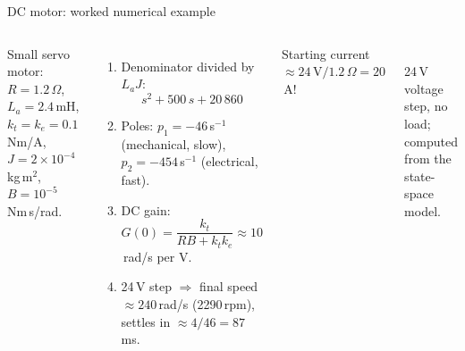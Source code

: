 \documentclass[aspectratio=169,10pt]{beamer}
\begin{document}
\begin{frame}{DC motor: worked numerical example}
\begin{columns}[T]
\footnotesize
Small servo motor: $R=1.2\,\Omega$, $L_a=2.4$\,mH, $k_t=k_e=0.1$\,Nm/A, $J=2\times10^{-4}$\,kg\,m$^2$, $B=10^{-5}$\,Nm\,s/rad.
\begin{enumerate}
  \item Denominator divided by $L_aJ$:
  \[s^2+500\,s+20\,860\]
  \item Poles: $p_1=-46$\,s$^{-1}$ (mechanical, slow), $p_2=-454$\,s$^{-1}$ (electrical, fast).
  \item DC gain: $G(0)=\dfrac{k_t}{RB+k_tk_e}\approx10$\,rad/s per V.
  \item 24\,V step $\Rightarrow$ final speed $\approx240$\,rad/s (2290\,rpm), settles in $\approx4/46=87$\,ms.
\end{enumerate}
Starting current $\approx24\,\mathrm{V}/1.2\,\Omega=20$\,A!
\centering
{}\\
\footnotesize 24\,V voltage step, no load; computed from the state-space model.
\end{columns}
\end{frame}
\end{document}
